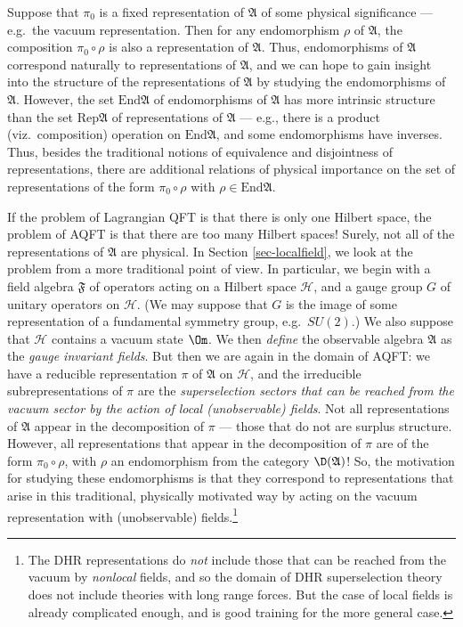 \documentclass[11pt]{article}
\newcommand{\alg}[1]{\mathfrak{#1}}
\theoremstyle{definition}
\theoremstyle{definition}
\theoremstyle{remark}
\def\2#1{{\mathcal #1}}
\def\al#1{{\mathfrak #1}}
\newcommand{\End}{\mathrm{End}}
\newcommand{\Rep}{\mathrm{Rep}}
\begin{document}
Suppose that $\pi _0$ is a fixed representation of $\al A$ of some
physical significance --- e.g.\ the vacuum representation.  Then for
any endomorphism $\rho$ of $\al A$, the composition $\pi _0\circ \rho$
is also a representation of $\al A$.  Thus, endomorphisms of $\alg{A}$
correspond naturally to representations of $\alg{A}$, and we can hope
to gain insight into the structure of the representations of $\alg{A}$
by studying the endomorphisms of $\al A$.  However, the set $\End \al
A$ of endomorphisms of $\al A$ has more intrinsic structure than the
set $\Rep \alg{A}$ of representations of $\alg{A}$ --- e.g., there is
a product (viz.\ composition) operation on $\End \al A$, and some
endomorphisms have inverses.  Thus, besides the traditional notions of
equivalence and disjointness of representations, there are additional
relations of physical importance on the set of representations of the
form $\pi _0\circ \rho$ with $\rho \in
\End \alg{A}$.

If the problem of Lagrangian QFT is that there is only one Hilbert
space, the problem of AQFT is that there are too many Hilbert spaces!
Surely, not all of the representations of $\alg{A}$ are physical.  In
Section \ref{sec-localfield}, we look at the problem from a more
traditional point of view.  In particular, we begin with a field
algebra $\alg{F}$ of operators acting on a Hilbert space $\2H$, and a
gauge group $G$ of unitary operators on $\2H$.  (We may suppose that
$G$ is the image of some representation of a fundamental symmetry
group, e.g.\ $SU(2)$.)  We also suppose that $\2H$ contains a vacuum
state $\Om$.  We then \emph{define} the observable algebra $\alg{A}$
as the \emph{gauge invariant fields}.  But then we are again in the
domain of AQFT: we have a reducible representation $\pi$ of $\al A$ on
$\2H$, and the irreducible subrepresentations of $\pi$ are the
\emph{superselection sectors that can be reached from the vacuum
  sector by the action of local (unobservable) fields}.  Not all
representations of $\alg{A}$ appear in the decomposition of $\pi$ ---
those that do not are surplus structure.  However, all representations
that appear in the decomposition of $\pi$ are of the form $\pi _0\circ
\rho$, with $\rho$ an endomorphism from the category $\D (\al A)$!
So, the motivation for studying these endomorphisms is that they
correspond to representations that arise in this traditional,
physically motivated way by acting on the vacuum representation with
(unobservable) fields.\footnote{The DHR representations do \emph{not}
  include those that can be reached from the vacuum by \emph{nonlocal}
  fields, and so the domain of DHR superselection theory does not
  include theories with long range forces.  But the case of local
  fields is already complicated enough, and is good training for the
  more general case.}
\end{document}
